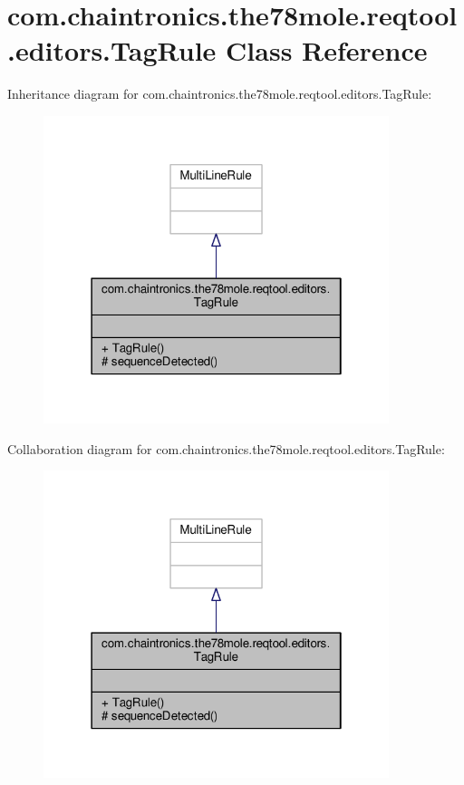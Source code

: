 \hypertarget{classcom_1_1chaintronics_1_1the78mole_1_1reqtool_1_1editors_1_1TagRule}{}\section{com.\+chaintronics.\+the78mole.\+reqtool.\+editors.\+Tag\+Rule Class Reference}
\label{classcom_1_1chaintronics_1_1the78mole_1_1reqtool_1_1editors_1_1TagRule}


Inheritance diagram for com.\+chaintronics.\+the78mole.\+reqtool.\+editors.\+Tag\+Rule\+:\nopagebreak
\begin{figure}[H]
\begin{center}
\leavevmode
\includegraphics[width=286pt]{db/d0b/classcom_1_1chaintronics_1_1the78mole_1_1reqtool_1_1editors_1_1TagRule__inherit__graph}
\end{center}
\end{figure}


Collaboration diagram for com.\+chaintronics.\+the78mole.\+reqtool.\+editors.\+Tag\+Rule\+:\nopagebreak
\begin{figure}[H]
\begin{center}
\leavevmode
\includegraphics[width=286pt]{d0/db7/classcom_1_1chaintronics_1_1the78mole_1_1reqtool_1_1editors_1_1TagRule__coll__graph}
\end{center}
\end{figure}
